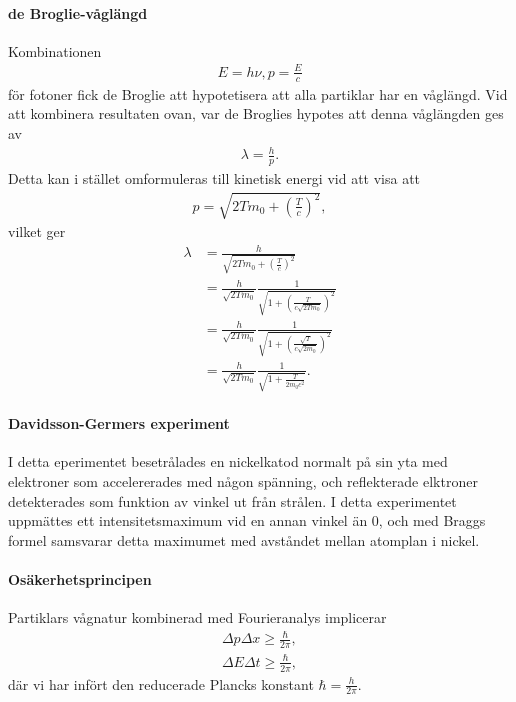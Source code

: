 \paragraph{de Broglie-våglängd}
Kombinationen
\begin{align*}
	E = h\nu, p = \frac{E}{c}
\end{align*}
för fotoner fick de Broglie att hypotetisera att alla partiklar har en våglängd. Vid att kombinera resultaten ovan, var de Broglies hypotes att denna våglängden ges av
\begin{align*}
	\lambda = \frac{h}{p}.
\end{align*}
Detta kan i stället omformuleras till kinetisk energi vid att visa att
\begin{align*}
	p = \sqrt{2Tm_{0} + \left(\frac{T}{c}\right)^{2}},
\end{align*}
vilket ger
\begin{align*}
	\lambda &= \frac{h}{\sqrt{2Tm_{0} + \left(\frac{T}{c}\right)^{2}}} \\
	        &= \frac{h}{\sqrt{2Tm_{0}}}\frac{1}{\sqrt{1 + \left(\frac{T}{c\sqrt{2Tm_{0}}}\right)^{2}}} \\
	        &= \frac{h}{\sqrt{2Tm_{0}}}\frac{1}{\sqrt{1 + \left(\frac{\sqrt{T}}{c\sqrt{2m_{0}}}\right)^{2}}} \\
	        &= \frac{h}{\sqrt{2Tm_{0}}}\frac{1}{\sqrt{1 + \frac{T}{2m_{0}c^{2}}}}.
\end{align*}

\paragraph{Davidsson-Germers experiment}
I detta eperimentet besetrålades en nickelkatod normalt på sin yta med elektroner som accelererades med någon spänning, och reflekterade elktroner detekterades som funktion av vinkel ut från strålen. I detta experimentet uppmättes ett intensitetsmaximum vid en annan vinkel än $0$, och med Braggs formel samsvarar detta maximumet med avståndet mellan atomplan i nickel.

\paragraph{Osäkerhetsprincipen}
Partiklars vågnatur kombinerad med Fourieranalys implicerar
\begin{align*}
	\Delta p \Delta x \geq \frac{\hbar}{2\pi}, \\
	\Delta E \Delta t \geq \frac{\hbar}{2\pi},
\end{align*}
där vi har infört den reducerade Plancks konstant $\hbar = \frac{h}{2\pi}$.

